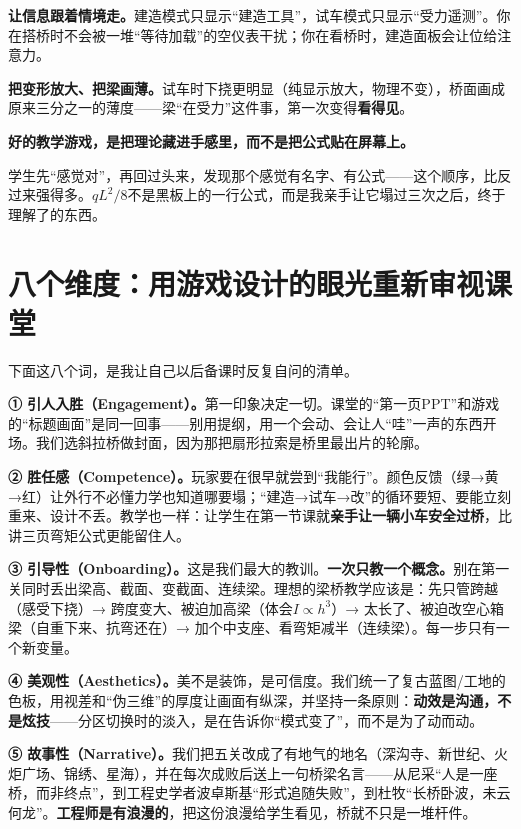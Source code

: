 \textbf{让信息跟着情境走。}建造模式只显示``建造工具''，试车模式只显示``受力遥测''。你在搭桥时不会被一堆``等待加载''的空仪表干扰；你在看桥时，建造面板会让位给注意力。

\textbf{把变形放大、把梁画薄。}试车时下挠更明显（纯显示放大，物理不变），桥面画成原来三分之一的薄度——梁``在受力''这件事，第一次变得\textbf{看得见}。

\begin{insight}
\label{insight:chap7}

\textbf{好的教学游戏，是把理论藏进手感里，而不是把公式贴在屏幕上。}

学生先``感觉对''，再回过头来，发现那个感觉有名字、有公式——这个顺序，比反过来强得多。$qL^2/8$不是黑板上的一行公式，而是我亲手让它塌过三次之后，终于理解了的东西。
\end{insight}

\section{八个维度：用游戏设计的眼光重新审视课堂}

下面这八个词，是我让自己以后备课时反复自问的清单。

\textbf{① 引人入胜（Engagement）。}第一印象决定一切。课堂的``第一页PPT''和游戏的``标题画面''是同一回事——别用提纲，用一个会动、会让人``哇''一声的东西开场。我们选斜拉桥做封面，因为那把扇形拉索是桥里最出片的轮廓。

\textbf{② 胜任感（Competence）。}玩家要在很早就尝到``我能行''。颜色反馈（绿→黄→红）让外行不必懂力学也知道哪要塌；``建造→试车→改''的循环要短、要能立刻重来、设计不丢。教学也一样：让学生在第一节课就\textbf{亲手让一辆小车安全过桥}，比讲三页弯矩公式更能留住人。

\textbf{③ 引导性（Onboarding）。}这是我们最大的教训。\textbf{一次只教一个概念。}别在第一关同时丢出梁高、截面、变截面、连续梁。理想的梁桥教学应该是：先只管跨越（感受下挠）→ 跨度变大、被迫加高梁（体会$I \propto h^3$）→ 太长了、被迫改空心箱梁（自重下来、抗弯还在）→ 加个中支座、看弯矩减半（连续梁）。每一步只有一个新变量。

\textbf{④ 美观性（Aesthetics）。}美不是装饰，是可信度。我们统一了复古蓝图/工地的色板，用视差和``伪三维''的厚度让画面有纵深，并坚持一条原则：\textbf{动效是沟通，不是炫技}——分区切换时的淡入，是在告诉你``模式变了''，而不是为了动而动。

\textbf{⑤ 故事性（Narrative）。}我们把五关改成了有地气的地名（深沟寺、新世纪、火炬广场、锦绣、星海），并在每次成败后送上一句桥梁名言——从尼采``人是一座桥，而非终点''，到工程史学者波卓斯基``形式追随失败''，到杜牧``长桥卧波，未云何龙''。\textbf{工程师是有浪漫的}，把这份浪漫给学生看见，桥就不只是一堆杆件。

